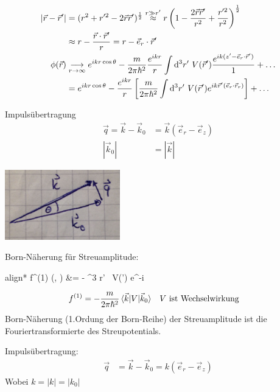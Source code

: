 		\begin{align*}
			|\vec{r} - \vec{r}'| &= (r^2+r'^2 - 2 \vec{r} \vec{r}')^{\frac{1}{2}} 
			\overset{r \gg r'}{\approx}
			r \left(1 - \frac{2 \vec{r} \vec{r}'}{r^2} + \frac{r'^2}{r^2}\right)^{\frac{1}{2}}\\
			&\approx r - \frac{\vec{r} \cdot \vec{r}'}{r} = r - \vec{e}_r \cdot \vec{r}'\\
			\phi (\vec{r}) &\underset{r\rightarrow \infty}{\longrightarrow} 
			e^{ikr \cos \theta} 
			- \frac{m}{2 \pi \hbar^2} \frac{e^{ikr}}{r}
			\int \mathrm{d}^3 r' ~V(\vec{r}') 
			\frac{e^{ik (z' - \vec{e}_r \cdot \vec{r}')}}{1} + \ldots \\
			&= e^{ikr \cos \theta} - \frac{e^{ikr}}{r}
			\left[ \frac{m}{2 \pi \hbar^2} \int \mathrm{d}^3 r' ~V(\vec{r}') 
				e^{ik \vec{r}' (\vec{e}_r \cdot \vec{r}_r)} 
			\right] + \ldots
		\end{align*}
	\begin{minipage}{0.5\textwidth}
	Impulsübertragung
		\begin{align*}
		\vec{q} = \vec{k} - \vec{k}_0 &= \vec{k} (\vec{e}_r - \vec{e}_z) \\
		|\vec{k}_0| &= |\vec{k}|
		\end{align*}
	\end{minipage}
	\hfill
	\begin{minipage}{0.4\textwidth}
		\includegraphics[width=5cm]{Born_Naeherung2}
	\end{minipage}
		
	Born-Näherung für Streuamplitude:
		\begin{empheq}[box=\boxed]{align*}
			f^{(1)} (\theta, \phi) &= - 
			\int \diff^3 r' ~V(') e^{-i  }
		\end{empheq}
		\begin{align*}
			f^{(1)} &= -\frac{m}{2 \pi \hbar^2}  \braket{\vec{k}| V | \vec{k}_0}
			& &V \text{ ist Wechselwirkung}
		\end{align*}
	Born-Näherung (1.Ordung der Born-Reihe) der Streuamplitude ist die Fouriertransformierte des Streupotentials.
	
	Impulsübertragung: 
		\begin{align*}
			\vec{q} &= \vec{k} - \vec{k}_0 
			= k (\vec{e}_r - \vec{e}_z)
		\end{align*}
	Wobei $k = |k| = |k_0|$
	
